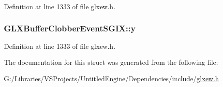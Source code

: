 Definition at line 1333 of file glxew.\+h.

\hypertarget{struct_g_l_x_buffer_clobber_event_s_g_i_x_aef21efa11558a5b67861f96471c56003}{}
\subsubsection[{y}]{ G\+L\+X\+Buffer\+Clobber\+Event\+S\+G\+I\+X\+::y}\label{struct_g_l_x_buffer_clobber_event_s_g_i_x_aef21efa11558a5b67861f96471c56003}


Definition at line 1333 of file glxew.\+h.



The documentation for this struct was generated from the following file\+:\begin{DoxyCompactItemize}
\item 
G\+:/\+Libraries/\+V\+S\+Projects/\+Untitled\+Engine/\+Dependencies/include/\hyperlink{glxew_8h}{glxew.\+h}\end{DoxyCompactItemize}
